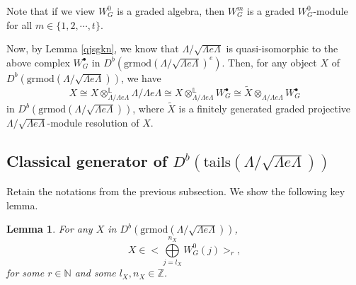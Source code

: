 \documentclass[11pt,reqno]{amsart}
\newtheorem{lemma}[theorem]{Lemma}
\theoremstyle{definition}
\begin{document}
Note that if we view 
$W_G^{0}$ is a graded algebra, 
then
$W_G^{m}$ is a graded 
$W_G^{0}$-module for 
all $m\in\{1, 2,\cdots, t\}$. 


Now, by Lemma \ref{qjsgkn}, we know that 
$\Lambda/\sqrt{\Lambda e \Lambda}$ is quasi-isomorphic to the above
complex $W_G^{\bullet}$ in $D^{b}(\mathrm{grmod}(\Lambda / \sqrt{\Lambda e \Lambda})^e )$. 
Then, for any object $X$ of 
$D^{b}(\mathrm{grmod}(\Lambda / \sqrt{\Lambda e \Lambda}) )$, 
we have 
\begin{equation}
\label{equivofX}
X \cong X \otimes_{\Lambda / \Lambda e \Lambda}^{\mathbb{L}} \Lambda / 
\Lambda e \Lambda \cong X \otimes_{\Lambda / \Lambda e \Lambda}^{\mathbb{L}} 
W_G^{\bullet} \cong \tilde{X} \otimes_{\Lambda / \Lambda e \Lambda} W_G^{\bullet} 
\end{equation}
in $D^{b}(\mathrm{grmod}(\Lambda / \sqrt{ \Lambda e \Lambda}) )$, 
where $\tilde{X}$ is a finitely generated graded  projective 
$\Lambda / \sqrt{\Lambda e \Lambda}$-module resolution of $X$. 


\subsection{Classical
generator of
$D^b(\mathrm{tails}(
\Lambda/\sqrt{\Lambda e\Lambda}
))$}
Retain the notations from the previous subsection.
We show 
the following key lemma.  

\begin{lemma}\label{hidjks}
For any $X$ in $D^{b}(\mathrm{grmod}(\Lambda / \sqrt{\Lambda e \Lambda}) )$,
$$
X \in \big< \bigoplus\limits_{j= l_X}^{n_X} W_G^{0}(j) \big>_{r},
$$
for some $r \in \mathbb{N}$ and some
$l_X, n_X \in \mathbb{Z}$. 	
\end{lemma}
\end{document}
